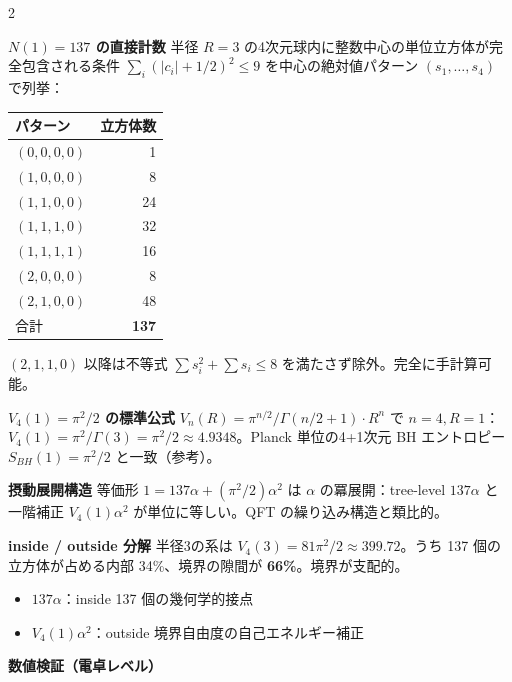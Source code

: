 \documentclass[9pt,a4paper]{ltjsarticle}
\begin{document}
\begin{multicols}{2}
\small

\textbf{$N(1) = 137$ の直接計数}\enspace
半径 $R=3$ の4次元球内に整数中心の単位立方体が完全包含される条件 $\sum_i (|c_i|+1/2)^2 \le 9$ を中心の絶対値パターン $(s_1,\ldots,s_4)$ で列挙：

\vspace{1pt}
{\footnotesize
\begin{tabular}{@{}lr@{}}
\toprule
パターン & 立方体数 \\
\midrule
$(0,0,0,0)$ & 1 \\
$(1,0,0,0)$ & 8 \\
$(1,1,0,0)$ & 24 \\
$(1,1,1,0)$ & 32 \\
$(1,1,1,1)$ & 16 \\
$(2,0,0,0)$ & 8 \\
$(2,1,0,0)$ & 48 \\
\midrule
合計 & \textbf{137} \\
\bottomrule
\end{tabular}
}

\smallskip
$(2,1,1,0)$ 以降は不等式 $\sum s_i^2 + \sum s_i \le 8$ を満たさず除外。完全に手計算可能。

\smallskip
\textbf{$V_4(1) = \pi^2/2$ の標準公式}\enspace
$V_n(R) = \pi^{n/2}/\Gamma(n/2+1) \cdot R^n$ で $n=4, R=1$：$V_4(1) = \pi^2/\Gamma(3) = \pi^2/2 \approx 4.9348$。Planck 単位の4+1次元 BH エントロピー $S_{BH}(1) = \pi^2/2$ と一致（参考）。

\smallskip
\textbf{摂動展開構造}\enspace
等価形 $1 = 137\alpha + (\pi^2/2)\alpha^2$ は $\alpha$ の冪展開：tree-level $137\alpha$ と一階補正 $V_4(1)\alpha^2$ が単位に等しい。QFT の繰り込み構造と類比的。

\smallskip
\textbf{inside / outside 分解}\enspace
半径3の系は $V_4(3) = 81\pi^2/2 \approx 399.72$。うち 137 個の立方体が占める内部 34\%、境界の隙間が \textbf{66\%}。境界が支配的。
\begin{itemize}[topsep=1pt]
\item $137\alpha$：inside 137 個の幾何学的接点
\item $V_4(1)\alpha^2$：outside 境界自由度の自己エネルギー補正
\end{itemize}

\columnbreak

\textbf{数値検証（電卓レベル）}


\end{multicols}
\end{document}
